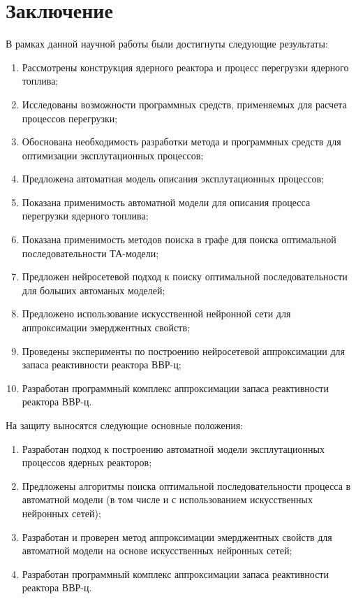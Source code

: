 \chapter*{Заключение}						%


В рамках данной научной работы были достигнуты следующие результаты:
\begin{enumerate}
    \item Рассмотрены конструкция ядерного реактора и процесс перегрузки ядерного топлива;
    \item Исследованы возможности программных средств, применяемых для расчета процессов перегрузки;
    \item Обоснована необходимость разработки метода и программных средств для оптимизации эксплутационных процессов;
    \item Предложена автоматная модель описания эксплутационных процессов;
    \item Показана применимость автоматной модели для описания процесса перегрузки ядерного топлива;
    \item Показана применимость методов поиска в графе для поиска оптимальной последовательности ТА-модели;
    \item Предложен нейросетевой подход к поиску оптимальной последовательности для больших автоманых моделей;
    \item Предложено использование искусственной нейронной сети для аппроксимации эмерджентных свойств;
    \item Проведены эксперименты по построению нейросетевой аппроксимации для запаса реактивности реактора ВВР-ц;
    \item Разработан программный комплекс аппроксимации запаса реактивности реактора ВВР-ц.
\end{enumerate}

На защиту выносятся следующие основные положения:
\begin{enumerate}
    \item Разработан подход к построению автоматной модели эксплутационных процессов ядерных реакторов;
    \item Предложены алгоритмы поиска оптимальной последовательности процесса в автоматной модели (в том числе и с использованием искусственных нейронных сетей);
    \item Разработан и проверен метод аппроксимации эмерджентных свойств для автоматной модели на основе искусственных нейронных сетей;
    \item Разработан программный комплекс аппроксимации запаса реактивности реактора ВВР-ц.
\end{enumerate}
